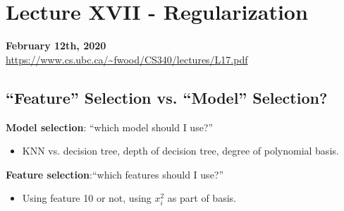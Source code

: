 \documentclass{article}
\def\blu#1{{\color{blu}#1}}
\def\gre#1{{\color{gre}#1}}
\theoremstyle{definition}
\begin{document}
\section*{Lecture XVII - Regularization}
\textbf{February 12th, 2020} \\
\url{https://www.cs.ubc.ca/~fwood/CS340/lectures/L17.pdf}

\subsection*{“Feature” Selection vs. “Model” Selection?}
\blu{\textbf{Model selection}}: “which model should I use?”
\begin{itemize}
	\item KNN vs. decision tree, depth of decision tree, \gre{degree of polynomial basis}. 
\end{itemize}
\blu{\textbf{Feature selection}}:“which features should I use?”
\begin{itemize}
	\item Using feature 10 or not, \gre{using $ x_i^2 $ as part of basis}.
\end{itemize}
\end{document}
